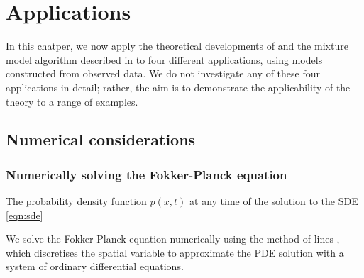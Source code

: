 \chapter{Applications}\label{ch:appls}



In this chatper, we now apply the theoretical developments of  and the mixture model algorithm described in  to four different applications, using models constructed from observed data.
We do not investigate any of these four applications in detail; rather, the aim is to demonstrate the applicability of the theory to a range of examples.



\section{Numerical considerations}






\subsection{Numerically solving the Fokker-Planck equation}

The probability density function \(p\!\left(x,t\right)\) at any time of the solution to the SDE \eqref{eqn:sde}



We solve the Fokker-Planck equation numerically using the method of lines \citep{}, which discretises the spatial variable to approximate the PDE solution with a system of ordinary differential equations.




